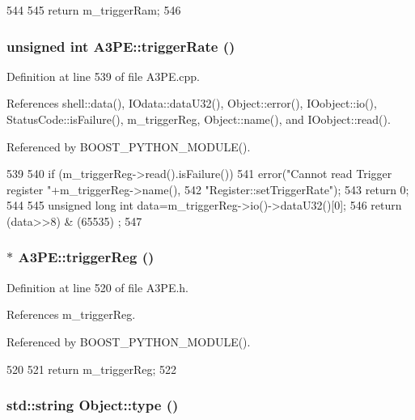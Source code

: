 \begin{DoxyCode}
544                    {
545     return m_triggerRam;
546   }
\end{DoxyCode}
\hypertarget{classA3PE_ada46375753047d6a74acdec442044f39}{
\subsubsection[{triggerRate}]{\setlength{\rightskip}{0pt plus 5cm}unsigned int A3PE::triggerRate ()}}
\label{classA3PE_ada46375753047d6a74acdec442044f39}


Definition at line 539 of file A3PE.cpp.

References shell::data(), IOdata::dataU32(), Object::error(), IOobject::io(), StatusCode::isFailure(), m\_\-triggerReg, Object::name(), and IOobject::read().

Referenced by BOOST\_\-PYTHON\_\-MODULE().


\begin{DoxyCode}
539                               {
540   if (m_triggerReg->read().isFailure()){
541     error("Cannot read Trigger register "+m_triggerReg->name(),
542         "Register::setTriggerRate");
543     return 0;
544   }
545   unsigned long int data=m_triggerReg->io()->dataU32()[0];
546   return (data>>8) & (65535) ; 
547 }
\end{DoxyCode}
\hypertarget{classA3PE_a4bf922f391fee6753fb0d53e133603b7}{
\subsubsection[{triggerReg}]{$\ast$ A3PE::triggerReg ()}}
\label{classA3PE_a4bf922f391fee6753fb0d53e133603b7}


Definition at line 520 of file A3PE.h.

References m\_\-triggerReg.

Referenced by BOOST\_\-PYTHON\_\-MODULE().


\begin{DoxyCode}
520                         {
521     return m_triggerReg;
522   }
\end{DoxyCode}
\hypertarget{classObject_a84f99f70f144a83e1582d1d0f84e4e62}{
\subsubsection[{type}]{\setlength{\rightskip}{0pt plus 5cm}std::string Object::type ()}}
\label{classObject_a84f99f70f144a83e1582d1d0f84e4e62}


